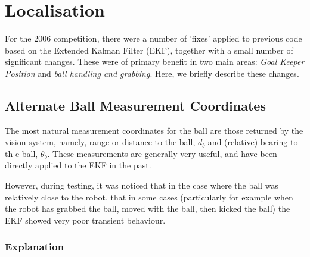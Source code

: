 \section{Localisation}

For the 2006 competition, there were a number of 'fixes' applied to
previous code based on the Extended Kalman Filter (EKF), together
with a small number of significant changes. These were of primary
benefit in two main areas: \emph{Goal Keeper Position} and
\emph{ball handling and grabbing}. Here, we briefly describe these
changes.

\subsection{Alternate Ball Measurement Coordinates}
\label{locwm:relbal}
The most natural measurement coordinates for the ball are those
returned by the vision system, namely, range or distance to the
ball, $d_b$ and (relative) bearing to th e ball, $\theta_b$. These
measurements are generally very useful, and have been directly
applied to the EKF in the past.

However, during testing, it was noticed that in the case where the
ball was relatively close to the robot, that in some cases
(particularly for example when the robot has grabbed the ball, moved
with the ball, then kicked the ball) the EKF showed very poor
transient behaviour.

\subsubsection{Explanation}

